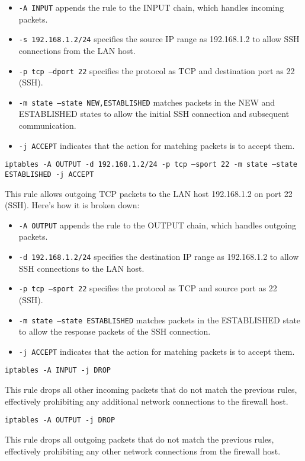 {\begin{enumerate}
		\begin{itemize}
			\item \texttt{-A INPUT} appends the rule to the INPUT chain, which handles incoming packets.
			\item \texttt{-s 192.168.1.2/24} specifies the source IP range as 192.168.1.2 to allow SSH connections from the LAN host.
			\item \texttt{-p tcp --dport 22} specifies the protocol as TCP and destination port as 22 (SSH).
			\item \texttt{-m state --state NEW,ESTABLISHED} matches packets in the NEW and ESTABLISHED states to allow the initial SSH connection and subsequent communication.
			\item \texttt{-j ACCEPT} indicates that the action for matching packets is to accept them.
		\end{itemize}
		
		\texttt{iptables -A OUTPUT -d 192.168.1.2/24 -p tcp --sport 22 -m state --state ESTABLISHED -j ACCEPT}
		
		This rule allows outgoing TCP packets to the LAN host 192.168.1.2 on port 22 (SSH). Here's how it is broken down:
		
		\begin{itemize}
			\item \texttt{-A OUTPUT} appends the rule to the OUTPUT chain, which handles outgoing packets.
			\item \texttt{-d 192.168.1.2/24} specifies the destination IP range as 192.168.1.2 to allow SSH connections to the LAN host.
			\item \texttt{-p tcp --sport 22} specifies the protocol as TCP and source port as 22 (SSH).
			\item \texttt{-m state --state ESTABLISHED} matches packets in the ESTABLISHED state to allow the response packets of the SSH connection.
			\item \texttt{-j ACCEPT} indicates that the action for matching packets is to accept them.
		\end{itemize}
		
		\texttt{iptables -A INPUT -j DROP}
		
		This rule drops all other incoming packets that do not match the previous rules, effectively prohibiting any additional network connections to the firewall host.
		
		\texttt{iptables -A OUTPUT -j DROP}
		
		This rule drops all outgoing packets that do not match the previous rules, effectively prohibiting any other network connections from the firewall host.
	\end{enumerate}}
	

